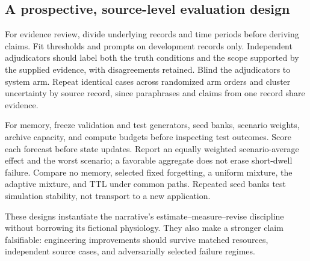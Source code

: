 \subsection{A prospective, source-level evaluation design}
For evidence review, divide underlying records and time periods before deriving claims. Fit thresholds and prompts on development records only. Independent adjudicators should label both the truth conditions and the scope supported by the supplied evidence, with disagreements retained. Blind the adjudicators to system arm. Repeat identical cases across randomized arm orders and cluster uncertainty by source record, since paraphrases and claims from one record share evidence.

For memory, freeze validation and test generators, seed banks, scenario weights, archive capacity, and compute budgets before inspecting test outcomes. Score each forecast before state updates. Report an equally weighted scenario-average effect and the worst scenario; a favorable aggregate does not erase short-dwell failure. Compare no memory, selected fixed forgetting, a uniform mixture, the adaptive mixture, and TTL under common paths. Repeated seed banks test simulation stability, not transport to a new application.

These designs instantiate the narrative's estimate--measure--revise discipline without borrowing its fictional physiology. They also make a stronger claim falsifiable: engineering improvements should survive matched resources, independent source cases, and adversarially selected failure regimes.
